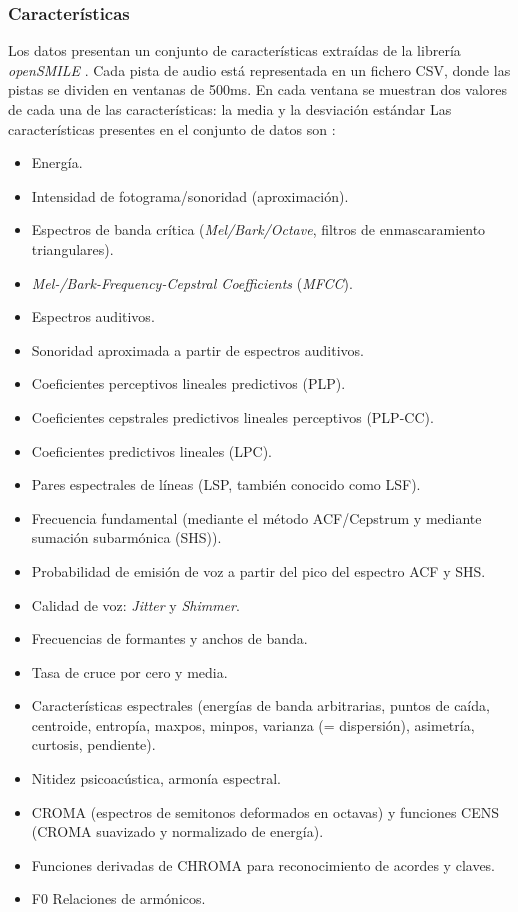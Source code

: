 \documentclass[12pt,a4paper,Spanish]{article}
\begin{document}
\subsubsection{Características}
Los datos presentan un conjunto de características extraídas de la librería \textit{openSMILE} \cite{openSMILE}. Cada pista de audio está representada en un fichero CSV, donde las pistas se dividen en ventanas de 500ms. En cada ventana se muestran dos valores de cada una de las características: la media y la desviación estándar
Las características presentes en el conjunto de datos son \cite{openSMILEfeatures}:
\begin{itemize}
	\item Energía.
	\item Intensidad de fotograma/sonoridad (aproximación).
	\item Espectros de banda crítica (\textit{Mel/Bark/Octave}, filtros de enmascaramiento triangulares).
	\item \textit{Mel-/Bark-Frequency-Cepstral Coefficients} (\textit{MFCC}).
	\item Espectros auditivos.
	\item Sonoridad aproximada a partir de espectros auditivos.
	\item Coeficientes perceptivos lineales predictivos (PLP).
	\item Coeficientes cepstrales predictivos lineales perceptivos (PLP-CC).
	\item Coeficientes predictivos lineales (LPC).
	\item Pares espectrales de líneas (LSP, también conocido como LSF).
	\item Frecuencia fundamental (mediante el método ACF/Cepstrum y mediante sumación subarmónica (SHS)).
	\item Probabilidad de emisión de voz a partir del pico del espectro ACF y SHS.
	\item Calidad de voz: \textit{Jitter} y \textit{Shimmer}.
	\item Frecuencias de formantes y anchos de banda.
	\item Tasa de cruce por cero y media.
	\item Características espectrales (energías de banda arbitrarias, puntos de caída, centroide, entropía, maxpos, minpos, varianza (= dispersión), asimetría, curtosis, pendiente).
	\item Nitidez psicoacústica, armonía espectral.
	\item  CROMA (espectros de semitonos deformados en octavas) y funciones CENS (CROMA suavizado y normalizado de energía).
	\item Funciones derivadas de CHROMA para reconocimiento de acordes y claves.
	\item F0 Relaciones de armónicos.
\end{itemize}
\end{document}
